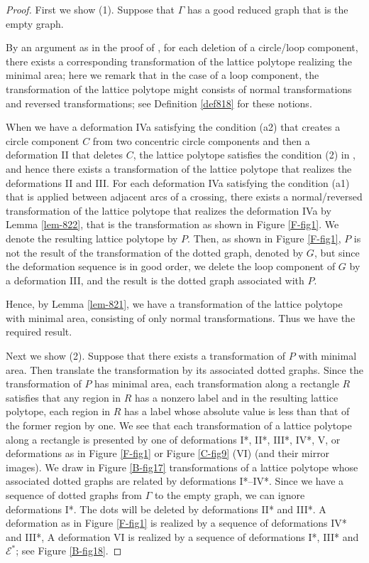 \documentclass[a4paper,11pt]{amsart}
\numberwithin{equation}{section}
\begin{document}
\begin{proof}


First we show (1). 
Suppose that $\Gamma$ has a good reduced graph that is the empty graph. 

By an argument as in the proof of \cite[Theorem 5.9]{N}, for each deletion of a circle/loop component, there exists a corresponding transformation of the lattice polytope realizing the minimal area; here we remark that in the case of a loop component, the transformation of the lattice polytope might consists of normal transformations and reversed transformations; see Definition \ref{def818} for these notions. 


When we have a deformation IVa satisfying the condition (a2) that creates a circle component $C$ from two concentric circle components and then a deformation II that deletes $C$, the lattice polytope satisfies the condition (2) in  \cite[Theorem 5.9]{N}, and hence there exists a transformation of the lattice polytope that realizes the deformations II and III. 
For each deformation IVa satisfying the condition (a1) that is applied between adjacent arcs of a crossing, there exists a normal/reversed transformation of the lattice polytope that realizes the deformation IVa by Lemma \ref{lem-822}, that is the transformation as shown in Figure \ref{F-fig1}. We denote the resulting lattice polytope by $P$. Then, as shown in Figure \ref{F-fig1}, $P$ is not the result of the transformation of the dotted graph, denoted by $G$, but 
since the deformation sequence is in good order, we delete the loop component of $G$ by a deformation III, and the result is the dotted graph associated with $P$. 

Hence, by Lemma \ref{lem-821}, we have a transformation of the lattice polytope with minimal area, consisting of only normal transformations. Thus we have the required result. 

Next we show (2). Suppose that there exists a transformation of $P$ with minimal area. Then translate the transformation by its associated dotted graphs. 
Since the transformation of $P$ has minimal area, each transformation along a rectangle $R$ satisfies that any region in $R$ has a nonzero label and in the resulting lattice polytope, each region in $R$ has a label whose absolute value is less than that of the former region by one. 
We see that each transformation of a lattice polytope along a rectangle is presented by one of deformations I*, II*, III*, IV*, V, or deformations as in Figure \ref{F-fig1} or Figure \ref{C-fig9} (VI) (and their mirror images). 
We draw in Figure \ref{B-fig17} transformations of a lattice polytope whose associated dotted graphs are related by deformations I*--IV*. 
Since we have a sequence of dotted graphs from $\Gamma$ to the empty graph, we can ignore deformations I*. The dots will be deleted by deformations II* and III*. 
A deformation as in Figure \ref{F-fig1} is realized by a sequence of deformations IV* and III*, 
A deformation VI is realized by a sequence of deformations I*, III* and $\mathcal{E}^*$; see Figure \ref{B-fig18}. 


\end{proof}
\end{document}
